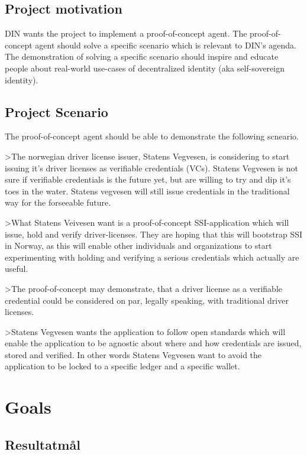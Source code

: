 \subsection{Project motivation}

DIN wants the project to implement a proof-of-concept agent. The proof-of-concept agent should solve a specific scenario which is relevant to DIN's agenda. The demonstration of solving a specific scenario should inspire and educate people about real-world use-cases of decentralized identity (aka self-sovereign identity).

\subsection{Project Scenario}

The proof-of-concept agent should be able to demonstrate the following scneario.

>The norwegian driver license issuer, Statens Vegvesen, is considering to start issuing it's driver licenses as verifiable credentials (VCs). Statens Vegvesen is not sure if verifiable credentials is the future yet, but are willing to try and dip it's toes in the water. Statens vegvesen will still issue credentials in the traditional way for the forseeable future.

>What Statens Veivesen want is a proof-of-concept SSI-application which will issue, hold and verify driver-licenses. They are hoping that this will bootstrap SSI in Norway, as this will enable other individuals and organizations to start experimenting with holding and verifying a serious credentials which actually are useful.

>The proof-of-concept may demonstrate, that a driver license as a verifiable credential could be considered on par, legally speaking, with traditional driver licenses.

>Statens Vegvesen wants the application to follow open standards which will enable the application to be agnostic about where and how credentials are issued, stored and verified. In other words Statens Vegvesen want to avoid the application to be locked to a specific ledger and a specific wallet.


\section{Goals}

\subsection{Resultatmål}

